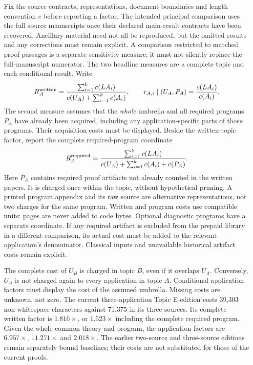 \documentclass[11pt,a4paper]{article}
\begin{document}
Fix the source contracts, representations, document boundaries and length
convention $c$ before reporting a factor. The intended principal comparison
uses the full source manuscripts once their declared main-result contracts
have been recovered. Ancillary material need not all be reproduced, but
the omitted results and any corrections must remain explicit. A comparison
restricted to matched proof passages is a separate sensitivity measure;
it must not silently replace the full-manuscript numerator.
The two headline measures are a complete topic and each conditional result.
Write
\[
 R_A^{\rm written}=\frac{\sum_{i=1}^k c(LA_i)}
 {c(U_A)+\sum_{i=1}^k c(A_i)},\qquad
 r_{A,i}\mid(U_A,P_A)=\frac{c(LA_i)}{c(A_i)}.
\]
The second measure assumes that the \emph{whole} umbrella and all required
programs $P_A$ have already been acquired, including any application-specific
parts of those programs. Their acquisition costs must be displayed. Beside
the written-topic factor, report the complete required-program coordinate
\[
 R_A^{\rm required}=\frac{\sum_{i=1}^k c(LA_i)}
 {c(U_A)+\sum_{i=1}^k c(A_i)+c(P_A)}.
\]
Here $P_A$ contains required proof artifacts not already counted in the
written papers. It is charged once within the topic, without hypothetical
pruning. A printed program appendix and its raw source are alternative
representations, not two charges for the same program. Written and program
costs use compatible units: pages are never added to code bytes. Optional
diagnostic programs have a separate coordinate. If any required artifact
is excluded from the prepaid library in a different comparison, its actual
cost must be added to the relevant application's denominator. Classical
inputs and unavailable historical artifact costs remain explicit.

The complete cost of $U_B$ is charged in topic $B$, even if it overlaps
$U_A$. Conversely, $U_A$ is not charged again to every application in
topic $A$. Conditional application factors must display the cost of the
assumed umbrella. Missing costs are unknown, not zero. The current three-application Topic E edition costs 39,303 non-whitespace
characters against 71,375 in its three sources. Its complete written factor
is $1.816\times$, or $1.523\times$ including the complete required program.
Given the whole common theory and program, the application factors are
$6.957\times$, $11.271\times$ and $2.018\times$. The earlier two-source and
three-source editions remain separately bound baselines; their costs are
not substituted for those of the current proofs.
\end{document}
